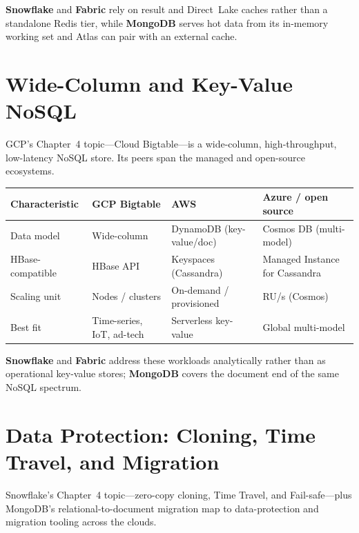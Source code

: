 \noindent \textbf{Snowflake} and \textbf{Fabric} rely on result and Direct~Lake caches rather than a
standalone Redis tier, while \textbf{MongoDB} serves hot data from its in-memory working set and
Atlas can pair with an external cache.

\section{Wide-Column and Key-Value NoSQL}
%
GCP's Chapter~4 topic---Cloud Bigtable---is a wide-column, high-throughput, low-latency NoSQL store.
Its peers span the managed and open-source ecosystems.

\begin{center}
\footnotesize
\begin{tabular}{@{}p{2.8cm}p{3.0cm}p{3.0cm}p{3.4cm}@{}}
\toprule
\textbf{Characteristic} & \textbf{GCP Bigtable} & \textbf{AWS} & \textbf{Azure / open source} \\
\midrule
Data model & Wide-column & DynamoDB (key-value/doc) & Cosmos DB (multi-model) \\
HBase-compatible & HBase API & Keyspaces (Cassandra) & Managed Instance for Cassandra \\
Scaling unit & Nodes / clusters & On-demand / provisioned & RU/s (Cosmos) \\
Best fit & Time-series, IoT, ad-tech & Serverless key-value & Global multi-model \\
\bottomrule
\end{tabular}
\end{center}

\noindent \textbf{Snowflake} and \textbf{Fabric} address these workloads analytically rather than as
operational key-value stores; \textbf{MongoDB} covers the document end of the same NoSQL spectrum.

\section{Data Protection: Cloning, Time Travel, and Migration}
%
Snowflake's Chapter~4 topic---zero-copy cloning, Time Travel, and Fail-safe---plus MongoDB's
relational-to-document migration map to data-protection and migration tooling across the clouds.

